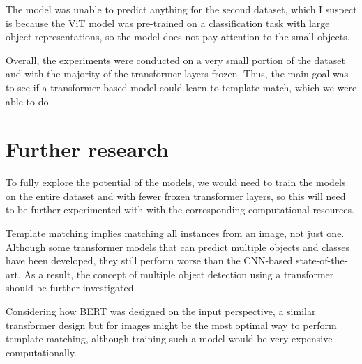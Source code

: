 \documentclass{report}[12pt, a4paper]
\begin{document}
The model was unable to predict anything for the second dataset, which I suspect is because the ViT model was pre-trained on a classification task with large object representations, so the model does not pay attention to the small objects.

Overall, the experiments were conducted on a very small portion of the dataset and with the majority of the transformer layers frozen. Thus, the main goal was to see if a transformer-based model could learn to template match, which we were able to do.

\section{Further research}

To fully explore the potential of the models, we would need to train the models on the entire dataset and with fewer frozen transformer layers, so this will need to be further experimented with with the corresponding computational resources.

Template matching implies matching all instances from an image, not just one. Although some transformer models that can predict multiple objects and classes have been developed\cite{detr_paper}\cite{yolos_paper}, they still perform worse than the CNN-based state-of-the-art. As a result, the concept of multiple object detection using a transformer should be further investigated.

Considering how BERT\cite{bert_paper} was designed on the input perspective, a similar transformer design but for images might be the most optimal way to perform template matching, although training such a model would be very expensive computationally.

\printbibliography[heading=bibintoc]
\end{document}
